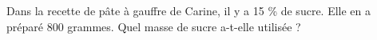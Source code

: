 \documentclass[exercice]{thedocument}%
\begin{document}
%
Dans la recette de pâte à gauffre de Carine, il y a 15 \% de sucre.
Elle en a préparé 800 grammes.\vskip5pt\noindent
Quel masse de sucre a-t-elle utilisée ?
\end{document}
